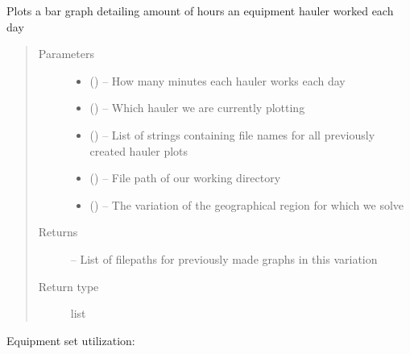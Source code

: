 \documentclass[letterpaper,10pt,english]{sphinxmanual}
\begin{document}
\begin{fulllineitems}
\label{\detokenize{reporting:reporting.hauler_graph_maker}}
Plots a bar graph detailing amount of hours an equipment hauler worked
each day
\begin{quote}\begin{description}
\item[{Parameters}] \leavevmode\begin{itemize}
\item {} 
 () -- How many minutes each hauler works each day

\item {} 
 () -- Which hauler we are currently plotting

\item {} 
 () -- List of strings containing file names for all previously created
hauler plots

\item {} 
 () -- File path of our working directory

\item {} 
 () -- The variation of the geographical region for which we solve

\end{itemize}

\item[{Returns}] \leavevmode
{} -- List of filepaths for previously made graphs in this variation

\item[{Return type}] \leavevmode
list

\end{description}\end{quote}

\end{fulllineitems}


Equipment set utilization:
\end{document}
